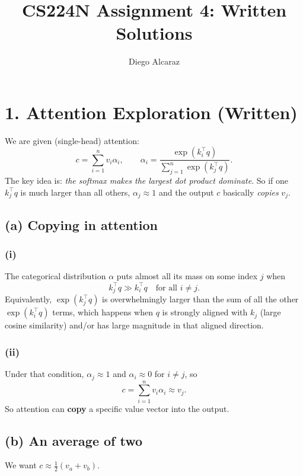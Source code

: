\documentclass[11pt]{article}
\title{CS224N Assignment 4: Written Solutions}
\author{Diego Alcaraz}
\date{}
\begin{document}
\maketitle

\section*{1. Attention Exploration (Written)}

We are given (single-head) attention:
\[
c=\sum_{i=1}^{n} v_i \alpha_i,
\qquad
\alpha_i=\frac{\exp(k_i^\top q)}{\sum_{j=1}^{n}\exp(k_j^\top q)}.
\]
The key idea is: \emph{the softmax makes the largest dot product dominate}. So if one $k_j^\top q$ is much larger than all others, $\alpha_j\approx 1$ and the output $c$ basically \emph{copies} $v_j$.

\subsection*{(a) Copying in attention}

\subsubsection*{(i)}
The categorical distribution $\alpha$ puts almost all its mass on some index $j$ when
\[
k_j^\top q \gg k_i^\top q \quad \text{for all } i\neq j.
\]
Equivalently, $\exp(k_j^\top q)$ is overwhelmingly larger than the sum of all the other $\exp(k_i^\top q)$ terms, which happens when $q$ is strongly aligned with $k_j$ (large cosine similarity) and/or has large magnitude in that aligned direction.

\subsubsection*{(ii)}
Under that condition, $\alpha_j\approx 1$ and $\alpha_i\approx 0$ for $i\neq j$, so
\[
c=\sum_{i=1}^{n} v_i \alpha_i \approx v_j.
\]
So attention can \textbf{copy} a specific value vector into the output.

\subsection*{(b) An average of two}

We want $c \approx \frac{1}{2}(v_a+v_b)$.
\end{document}
